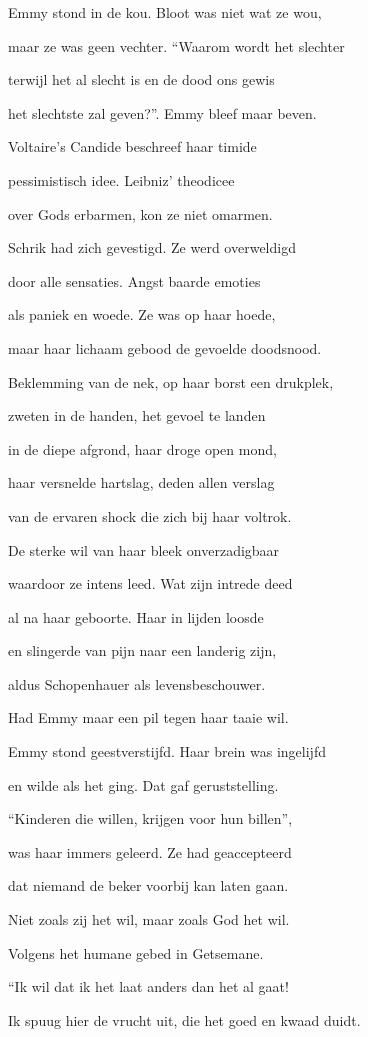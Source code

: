 Emmy stond in de kou.
Bloot was niet wat ze wou,

maar ze was geen vechter.
“Waarom wordt het slechter

terwijl het al slecht is
en de dood ons gewis

het slechtste zal geven?”.
Emmy bleef maar beven.

Voltaire’s Candide
beschreef haar timide

pessimistisch idee.
Leibniz’ theodicee

over Gods erbarmen,
kon ze niet omarmen.

Schrik had zich gevestigd.
Ze werd overweldigd

door alle sensaties.
Angst baarde emoties

als paniek en woede.
Ze was op haar hoede,

maar haar lichaam gebood
de gevoelde doodsnood.

Beklemming van de nek,
op haar borst een drukplek,

zweten in de handen,
het gevoel te landen

in de diepe afgrond,
haar droge open mond,

haar versnelde hartslag,
deden allen verslag

van de ervaren shock
die zich bij haar voltrok.

De sterke wil van haar
bleek onverzadigbaar

waardoor ze intens leed.
Wat zijn intrede deed

al na haar geboorte.
Haar in lijden loosde

en slingerde van pijn
naar een landerig zijn,

aldus Schopenhauer
als levensbeschouwer.

Had Emmy maar een pil
tegen haar taaie wil.

Emmy stond geestverstijfd.
Haar brein was ingelijfd

en wilde als het ging.
Dat gaf geruststelling.

“Kinderen die willen,
krijgen voor hun billen”,

was haar immers geleerd.
Ze had geaccepteerd

dat niemand de beker
voorbij kan laten gaan.

Niet zoals zij het wil,
maar zoals God het wil.

Volgens het humane
gebed in Getsemane.

“Ik wil dat ik het laat
anders dan het al gaat!

Ik spuug hier de vrucht uit,
die het goed en kwaad duidt.

